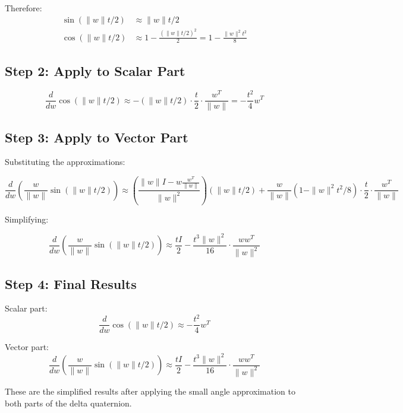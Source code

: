 \documentclass{article}
\begin{document}
	Therefore:
	\begin{align*}
		\sin(\|w\|t/2) &\approx \|w\|t/2 \\
		\cos(\|w\|t/2) &\approx 1 - \frac{(\|w\|t/2)^2}{2} = 1 - \frac{\|w\|^2t^2}{8}
	\end{align*}

	\subsection{Step 2: Apply to Scalar Part}

	$$\frac{d}{dw} \cos(\|w\| t/2) \approx -(\|w\|t/2) \cdot \frac{t}{2} \cdot \frac{w^T}{\|w\|} = -\frac{t^2}{4} w^T$$

	\subsection{Step 3: Apply to Vector Part}

	Substituting the approximations:

	$$\frac{d}{dw}\left(\frac{w}{\|w\|} \sin(\|w\| t/2)\right) \approx \left(\frac{\|w\|I - w\frac{w^T}{\|w\|}}{\|w\|^2}\right) (\|w\|t/2) + \frac{w}{\|w\|} (1 - \|w\|^2t^2/8) \cdot \frac{t}{2} \cdot \frac{w^T}{\|w\|}$$

	Simplifying:

	$$\frac{d}{dw}\left(\frac{w}{\|w\|} \sin(\|w\| t/2)\right) \approx \frac{tI}{2} - \frac{t^3\|w\|^2}{16} \cdot \frac{w w^T}{\|w\|^2}$$

	\subsection{Step 4: Final Results}

	Scalar part:
	$$\frac{d}{dw} \cos(\|w\| t/2) \approx -\frac{t^2}{4} w^T$$

	Vector part:
	$$\frac{d}{dw}\left(\frac{w}{\|w\|} \sin(\|w\| t/2)\right) \approx \frac{tI}{2} - \frac{t^3\|w\|^2}{16} \cdot \frac{w w^T}{\|w\|^2}$$

	These are the simplified results after applying the small angle approximation to both parts of the delta quaternion.
\end{document}
